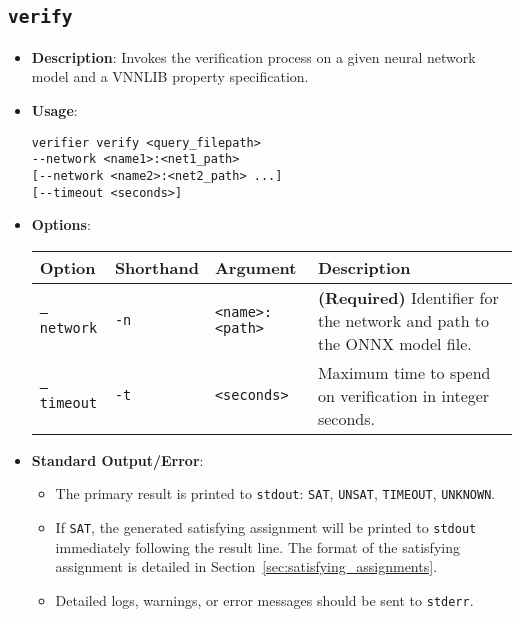 \subsection{\texttt{verify}}
\begin{itemize}
    \item \textbf{Description}: Invokes the verification process on a given neural network model and a VNNLIB property specification.

    \item \textbf{Usage}:
    \begin{lstlisting}[style=bash]
verifier verify <query_filepath> 
--network <name1>:<net1_path> 
[--network <name2>:<net2_path> ...] 
[--timeout <seconds>]
    \end{lstlisting}

    \item \textbf{Options}:
    \begin{longtable}{@{}>{\raggedright\arraybackslash\ttfamily}p{}   %
                    >{\raggedright\arraybackslash\ttfamily}p{}        %
                    >{\raggedright\arraybackslash\ttfamily}p{}        %
                    >{\raggedright\arraybackslash}p{}@{}}              %
        \toprule
        Option & Shorthand & Argument & Description \\
        \midrule
        \bottomrule
        \texttt{--network} & \texttt{-n} & \texttt{<name>:<path>} & \textbf{(Required)} Identifier for the network and path to the ONNX model file. \\
        \texttt{--timeout} & \texttt{-t} & \texttt{<seconds>} & Maximum time to spend on verification in integer seconds. \\
    \end{longtable}
    
    \item \textbf{Standard Output/Error}:
    \begin{itemize}
        \item The primary result is printed to \texttt{stdout}: \texttt{SAT}, \texttt{UNSAT}, \texttt{TIMEOUT}, \texttt{UNKNOWN}.
        \item If \texttt{SAT}, the generated satisfying assignment will be printed to \texttt{stdout} immediately following the result line. 
        The format of the satisfying assignment is detailed in Section~\ref{sec:satisfying_assignments}.
        \item Detailed logs, warnings, or error messages should be sent to \texttt{stderr}.
    \end{itemize}
\end{itemize}

